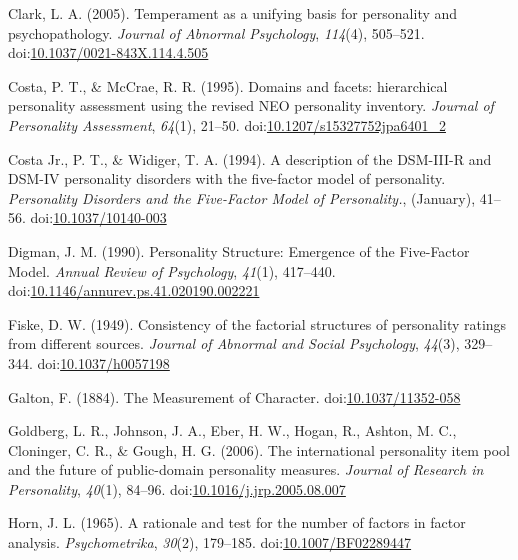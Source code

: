\documentclass[man]{apa6}
\theoremstyle{definition}
\theoremstyle{definition}
\theoremstyle{definition}
\theoremstyle{remark}
\begin{document}
\leavevmode\hypertarget{ref-Clark2005}{}%
Clark, L. A. (2005). Temperament as a unifying basis for personality and
psychopathology. \emph{Journal of Abnormal Psychology}, \emph{114}(4),
505--521.
doi:\href{https://doi.org/10.1037/0021-843X.114.4.505}{10.1037/0021-843X.114.4.505}

\leavevmode\hypertarget{ref-Costa1995}{}%
Costa, P. T., \& McCrae, R. R. (1995). Domains and facets: hierarchical
personality assessment using the revised NEO personality inventory.
\emph{Journal of Personality Assessment}, \emph{64}(1), 21--50.
doi:\href{https://doi.org/10.1207/s15327752jpa6401_2}{10.1207/s15327752jpa6401\_2}

\leavevmode\hypertarget{ref-Widiger1994}{}%
Costa Jr., P. T., \& Widiger, T. A. (1994). A description of the
DSM-III-R and DSM-IV personality disorders with the five-factor model of
personality. \emph{Personality Disorders and the Five-Factor Model of
Personality.}, (January), 41--56.
doi:\href{https://doi.org/10.1037/10140-003}{10.1037/10140-003}

\leavevmode\hypertarget{ref-Digman1990}{}%
Digman, J. M. (1990). Personality Structure: Emergence of the
Five-Factor Model. \emph{Annual Review of Psychology}, \emph{41}(1),
417--440.
doi:\href{https://doi.org/10.1146/annurev.ps.41.020190.002221}{10.1146/annurev.ps.41.020190.002221}

\leavevmode\hypertarget{ref-Fiske1949}{}%
Fiske, D. W. (1949). Consistency of the factorial structures of
personality ratings from different sources. \emph{Journal of Abnormal
and Social Psychology}, \emph{44}(3), 329--344.
doi:\href{https://doi.org/10.1037/h0057198}{10.1037/h0057198}

\leavevmode\hypertarget{ref-Galton1884}{}%
Galton, F. (1884). The Measurement of Character.
doi:\href{https://doi.org/10.1037/11352-058}{10.1037/11352-058}

\leavevmode\hypertarget{ref-Goldberg2006}{}%
Goldberg, L. R., Johnson, J. A., Eber, H. W., Hogan, R., Ashton, M. C.,
Cloninger, C. R., \& Gough, H. G. (2006). The international personality
item pool and the future of public-domain personality measures.
\emph{Journal of Research in Personality}, \emph{40}(1), 84--96.
doi:\href{https://doi.org/10.1016/j.jrp.2005.08.007}{10.1016/j.jrp.2005.08.007}

\leavevmode\hypertarget{ref-Horn1965}{}%
Horn, J. L. (1965). A rationale and test for the number of factors in
factor analysis. \emph{Psychometrika}, \emph{30}(2), 179--185.
doi:\href{https://doi.org/10.1007/BF02289447}{10.1007/BF02289447}
\end{document}
